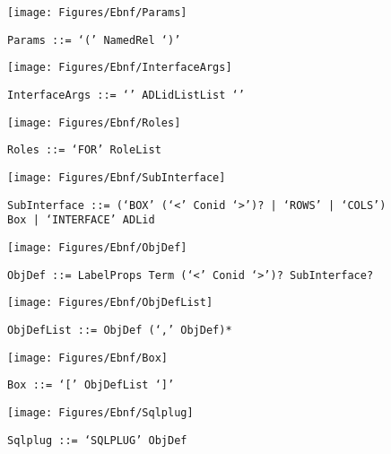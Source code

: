  \begin{figure}[H]
  \centering
  \texttt{[image: Figures/Ebnf/Params]}
  \caption*{\texttt{Params \small::=  `(' NamedRel `)'}}
  \label{fig:ebnf-Params}
 \end{figure}

 \begin{figure}[H]
  \centering
  \texttt{[image: Figures/Ebnf/InterfaceArgs]}
  \caption*{\texttt{InterfaceArgs \small::=  `{' ADLidListList `}'}}
  \label{fig:ebnf-InterfaceArgs}
 \end{figure}

 \begin{figure}[H]
  \centering
  \texttt{[image: Figures/Ebnf/Roles]}
  \caption*{\texttt{Roles \small::=  `FOR' RoleList}}
  \label{fig:ebnf-Roles}
 \end{figure}

 \begin{figure}[H]
  \centering
  \texttt{[image: Figures/Ebnf/SubInterface]}
  \caption*{\texttt{SubInterface \small::=  (`BOX' (`<' Conid `>')? | `ROWS' | `COLS') Box | `INTERFACE' ADLid}}
  \label{fig:ebnf-SubInterface}
 \end{figure}

 \begin{figure}[H]
  \centering
  \texttt{[image: Figures/Ebnf/ObjDef]}
  \caption*{\texttt{ObjDef \small::=  LabelProps Term (`<' Conid `>')? SubInterface?}}
  \label{fig:ebnf-ObjDef}
 \end{figure}

 \begin{figure}[H]
  \centering
  \texttt{[image: Figures/Ebnf/ObjDefList]}
  \caption*{\texttt{ObjDefList \small::=  ObjDef (`,' ObjDef)*}}
  \label{fig:ebnf-ObjDefList}
 \end{figure}

 \begin{figure}[H]
  \centering
  \texttt{[image: Figures/Ebnf/Box]}
  \caption*{\texttt{Box \small::=  `[' ObjDefList `]'}}
  \label{fig:ebnf-Box}
 \end{figure}

 \begin{figure}[H]
  \centering
  \texttt{[image: Figures/Ebnf/Sqlplug]}
  \caption*{\texttt{Sqlplug \small::=  `SQLPLUG' ObjDef}}
  \label{fig:ebnf-Sqlplug}
 \end{figure}

